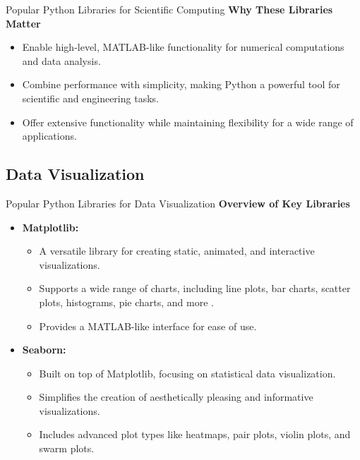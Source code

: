 \documentclass[10pt]{beamer}
\let\olditem\item
\renewcommand\item{\olditem\justifying}
\begin{document}
	
	\begin{frame}{Popular Python Libraries for Scientific Computing}
			\textbf{Why These Libraries Matter}
	\begin{itemize}
		\item Enable high-level, MATLAB-like functionality for numerical computations and data analysis.
		\item Combine performance with simplicity, making Python a powerful tool for scientific and engineering tasks.
		\item Offer extensive functionality while maintaining flexibility for a wide range of applications.
	\end{itemize}
		\end{frame}
		
	\subsection{Data Visualization}
	\begin{frame}{Popular Python Libraries for Data Visualization}
		\textbf{Overview of Key Libraries}
		\begin{itemize}
			\item \textbf{Matplotlib:}
			\begin{itemize}
				\item A versatile library for creating static, animated, and interactive visualizations.
				\item Supports a wide range of charts, including line plots, bar charts, scatter plots, histograms, pie charts, and more \supercite{matplotlibExamplesx2014}.
				\item Provides a MATLAB-like interface for ease of use.
			\end{itemize}
			\item \textbf{Seaborn:}
			\begin{itemize}
				\item Built on top of Matplotlib, focusing on statistical data visualization.
				\item Simplifies the creation of aesthetically pleasing and informative visualizations.
				\item Includes advanced plot types like heatmaps, pair plots, violin plots, and swarm plots. \supercite{pydataExampleGallery}
			\end{itemize}
		\end{itemize}
	\end{frame}
	
\end{document}
